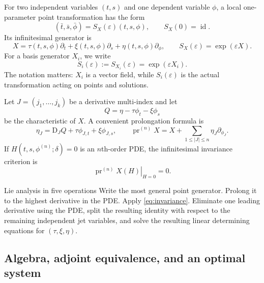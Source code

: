 \documentclass[11pt]{article}
\newcommand{\D}{\mathrm D}
\newcommand{\pr}{\operatorname{pr}}
\newcommand{\eps}{\varepsilon}
\begin{document}
For two independent variables $(t,s)$ and one dependent variable $\phi$, a local one-parameter point transformation has the form
\begin{equation}
 (\bar t,\bar s,\bar\phi)
 =S_X(\eps)(t,s,\phi),
 \qquad S_X(0)=\operatorname{id}.
 \label{eq:finite-group}
\end{equation}
Its infinitesimal generator is
\begin{equation}
 X=\tau(t,s,\phi)\partial_t+\xi(t,s,\phi)\partial_s
   +\eta(t,s,\phi)\partial_\phi,
 \qquad
 S_X(\eps)=\exp(\eps X).
 \label{eq:generator}
\end{equation}
For a basis generator $X_i$, we write
\begin{equation}
 S_i(\eps):=S_{X_i}(\eps)=\exp(\eps X_i).
 \label{eq:Si}
\end{equation}
The notation matters: $X_i$ is a vector field, while $S_i(\eps)$ is the actual transformation acting on points and solutions.

Let $J=(j_1,\ldots,j_k)$ be a derivative multi-index and let
\begin{equation}
 Q=\eta-\tau\phi_t-\xi\phi_s
 \label{eq:characteristic}
\end{equation}
be the characteristic of $X$.  A convenient prolongation formula is
\begin{equation}
 \eta_J=\D_JQ+\tau\phi_{J,t}+\xi\phi_{J,s},
 \qquad
 \pr^{(n)}X=X+\sum_{1\le |J|\le n}\eta_J\partial_{\phi_J}.
 \label{eq:prolongation}
\end{equation}
If $H(t,s,\phi^{(n)};\delta)=0$ is an $n$th-order PDE, the infinitesimal invariance criterion is
\begin{equation}
 \left.\pr^{(n)}X(H)\right|_{H=0}=0.
 \label{eq:invariance}
\end{equation}

\begin{instruction}{Lie analysis in five operations}
Write the most general point generator.  Prolong it to the highest derivative in the PDE.  Apply \cref{eq:invariance}.  Eliminate one leading derivative using the PDE, split the resulting identity with respect to the remaining independent jet variables, and solve the resulting linear determining equations for $(\tau,\xi,\eta)$.
\end{instruction}

\subsection{Algebra, adjoint equivalence, and an optimal system}
\end{document}
